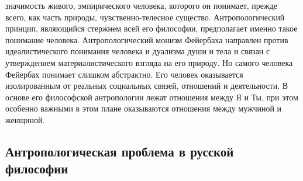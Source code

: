 \documentclass[12pt]{article}
\begin{document}
значимость  живого,  эмпирического  человека,  которого  он  понимает,  прежде  всего,  как  часть  природы,
чувственно-телесное  существо.  Антропологический  принцип,  являющийся  стержнем  всей  его  философии,
предполагает  именно  такое понимание человека.  Антропологический монизм  Фейербаха направлен  против
идеалистического понимания человека и дуализма души и тела и связан с утверждением материалистического
взгляда на его природу. Но самого человека Фейербах понимает слишком абстрактно. Его человек оказывается
изолированным  от  реальных  социальных  связей,  отношений  и  деятельности.  В  основе  его  философской
антропологии  лежат  отношения  между  Я  и  Ты,  при  этом  особенно  важными  в  этом  плане  оказываются
отношения между мужчиной и женщиной.


\subsection{Антропологическая проблема в русской философии}
\end{document}
